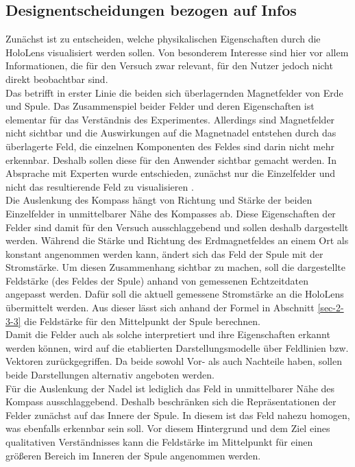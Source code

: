\subsection{Designentscheidungen bezogen auf Infos}
Zunächst ist zu entscheiden, welche physikalischen Eigenschaften durch die HoloLens visualisiert werden sollen. Von besonderem Interesse sind hier vor allem Informationen, die für den Versuch zwar relevant, für den Nutzer jedoch nicht direkt beobachtbar sind.\\

Das betrifft in erster Linie die beiden sich überlagernden Magnetfelder von Erde und Spule. Das Zusammenspiel beider Felder und deren Eigenschaften ist elementar für das Verständnis des Experimentes. Allerdings sind Magnetfelder nicht sichtbar und die Auswirkungen auf die Magnetnadel entstehen durch das überlagerte Feld, die einzelnen Komponenten des Feldes sind darin nicht mehr erkennbar. Deshalb sollen diese für den Anwender sichtbar gemacht werden. In Absprache mit Experten wurde entschieden, zunächst nur die Einzelfelder und nicht das resultierende Feld zu visualisieren \cite{Reinholz18}.\\

Die Auslenkung des Kompass hängt von Richtung und Stärke der beiden Einzelfelder in unmittelbarer Nähe des Kompasses ab. Diese Eigenschaften der Felder sind damit für den Versuch ausschlaggebend und sollen deshalb dargestellt werden. Während die Stärke und Richtung des Erdmagnetfeldes an einem Ort als konstant angenommen werden kann, ändert sich das Feld der Spule mit der Stromstärke. Um diesen Zusammenhang sichtbar zu machen, soll die dargestellte Feldstärke (des Feldes der Spule) anhand von gemessenen Echtzeitdaten angepasst werden. Dafür soll die aktuell gemessene Stromstärke an die HoloLens übermittelt werden. Aus dieser lässt sich anhand der Formel in Abschnitt \ref{sec-2-3-3} die Feldstärke für den Mittelpunkt der Spule berechnen.\\

Damit die Felder auch als solche interpretiert und ihre Eigenschaften erkannt werden können, wird auf die etablierten Darstellungsmodelle über Feldlinien bzw. Vektoren zurückgegriffen. Da beide sowohl Vor- als auch Nachteile haben, sollen beide Darstellungen alternativ angeboten werden.\\

Für die Auslenkung der Nadel ist lediglich das Feld in unmittelbarer Nähe des Kompass ausschlaggebend. Deshalb beschränken sich die Repräsentationen der Felder zunächst auf das Innere der Spule. In diesem ist das Feld nahezu homogen, was ebenfalls erkennbar sein soll. Vor diesem Hintergrund und dem Ziel eines qualitativen Verständnisses kann die Feldstärke im Mittelpunkt für einen größeren Bereich im Inneren der Spule angenommen werden.\\


